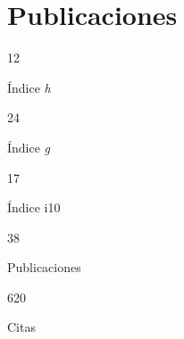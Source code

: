 \documentclass[11pt,a4paper,]{awesome-cv}
\begin{document}
\hypertarget{publicaciones}{%
\section{Publicaciones}\label{publicaciones}}

\begin{tcolorbox}[enhanced,
        on line, 
        boxsep=4pt, left=0pt,right=0pt,top=0pt,bottom=0pt,
        colframe=white,colback=teal,
        hyperurl={https://scholar.google.com/citations?user=8Q0jKHsAAAAJ}]
  
\color{white}
\begin{minipage}[c]{0.195\linewidth}
  \begin{center} \begin{huge} 12 \end{huge}
  \begin{small} Índice \textit{h} \end{small} \end{center} 
\end{minipage} \begin{minipage}[c]{0.195\linewidth}
  \begin{center} \begin{huge} 24 \end{huge}
  \begin{small} Índice \textit{g} \end{small} \end{center}
\end{minipage} \begin{minipage}[c]{0.195\linewidth}
  \begin{center} \begin{huge} 17 \end{huge}
  \begin{small} Índice i10 \end{small} \end{center}
\end{minipage} \begin{minipage}[c]{0.195\linewidth}
  \begin{center} \begin{huge} 38 \end{huge}
  \begin{small} Publicaciones \end{small} \end{center}
\end{minipage} \begin{minipage}[c]{0.195\linewidth}  
  \begin{center} \begin{huge} 620 \end{huge} 
  \begin{small} Citas \end{small} \end{center}
\end{minipage}
\end{tcolorbox}
\end{document}
